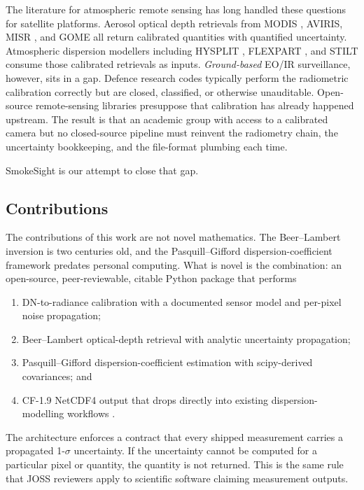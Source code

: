 \documentclass[11pt, a4paper]{article}
\begin{document}
The literature for atmospheric remote sensing has long handled these
questions for satellite platforms. Aerosol optical depth retrievals from
MODIS \cite{remer2005modis}, AVIRIS, MISR \cite{kahn2010maisr}, and GOME
\cite{burrows1999gome} all return calibrated quantities with quantified
uncertainty. Atmospheric dispersion modellers including HYSPLIT
\cite{stein2015hysplit}, FLEXPART \cite{stohl2005flexpart}, and STILT
\cite{lin2003stilt} consume those calibrated retrievals as inputs.
\emph{Ground-based} EO/IR surveillance, however, sits in a gap.
Defence research codes typically perform the radiometric calibration
correctly but are closed, classified, or otherwise unauditable.
Open-source remote-sensing libraries presuppose that calibration has
already happened upstream. The result is that an academic group with
access to a calibrated camera but no closed-source pipeline must reinvent
the radiometry chain, the uncertainty bookkeeping, and the file-format
plumbing each time.

SmokeSight is our attempt to close that gap.

\subsection{Contributions}
\label{sec:contributions}

The contributions of this work are not novel mathematics. The
Beer--Lambert inversion is two centuries old, and the Pasquill--Gifford
dispersion-coefficient framework \cite{pasquill1961dispersion,
gifford1976turbulent} predates personal computing. What is novel is the
combination: an open-source, peer-reviewable, citable Python package
that performs

\begin{enumerate}
  \item DN-to-radiance calibration with a documented sensor model and
        per-pixel noise propagation;
  \item Beer--Lambert optical-depth retrieval with analytic
        uncertainty propagation;
  \item Pasquill--Gifford dispersion-coefficient estimation with
        scipy-derived covariances; and
  \item CF-1.9 NetCDF4 output that drops directly into existing
        dispersion-modelling workflows \cite{eaton2003netcdf}.
\end{enumerate}

The architecture enforces a contract that every shipped measurement
carries a propagated 1-$\sigma$ uncertainty. If the uncertainty cannot
be computed for a particular pixel or quantity, the quantity is not
returned. This is the same rule that JOSS reviewers \cite{smith2018joss}
apply to scientific software claiming measurement outputs.
\end{document}
